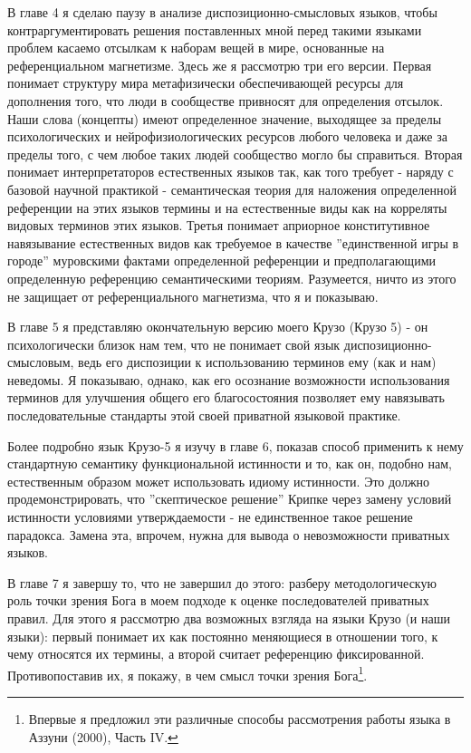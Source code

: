 \documentclass{book}
\begin{document}
В главе 4 я сделаю паузу в анализе диспозиционно-смысловых языков, чтобы контраргументировать решения поставленных мной перед такими языками проблем касаемо отсылкам к наборам вещей в мире, основанные на референциальном магнетизме. Здесь же я рассмотрю три его версии. Первая понимает структуру мира метафизически обеспечивающей ресурсы для дополнения того, что люди в сообществе привносят для определения отсылок. Наши слова (концепты) имеют определенное значение, выходящее за пределы психологических и нейрофизиологических ресурсов любого человека и даже за пределы того, с чем любое таких людей сообщество могло бы справиться. Вторая понимает интерпретаторов естественных языков так, как того требует - наряду с базовой научной практикой - семантическая теория для наложения определенной референции на этих языков термины и на естественные виды как на корреляты видовых терминов этих языков. Третья понимает априорное конститутивное навязывание естественных видов как требуемое в качестве ''единственной игры в городе'' муровскими фактами определенной референции и предполагающими определенную референцию семантическими теориям. Разумеется, ничто из этого не защищает от референциального магнетизма, что я и показываю.

В главе 5 я представляю окончательную версию моего Крузо (Крузо 5) - он психологически близок нам тем, что не понимает свой язык диспозиционно-смысловым, ведь его диспозиции к использованию терминов ему (как и нам) неведомы. Я показываю, однако, как его осознание возможности использования терминов для улучшения общего его благосостояния позволяет ему навязывать последовательные стандарты этой своей приватной языковой практике.

Более подробно язык Крузо-5 я изучу в главе 6, показав способ применить к нему стандартную семантику функциональной истинности и то, как он, подобно нам, естественным образом может использовать идиому истинности. Это должно продемонстрировать, что ''скептическое решение'' Крипке через замену условий истинности условиями утверждаемости - не единственное такое решение парадокса. Замена эта, впрочем, нужна для вывода о невозможности приватных языков.

В главе 7 я завершу то, что не завершил до этого: разберу методологическую роль точки зрения Бога в моем подходе к оценке последователей приватных правил. Для этого я рассмотрю два возможных взгляда на языки Крузо (и наши языки): первый понимает их как постоянно меняющиеся в отношении того, к чему относятся их термины, а второй считает референцию фиксированной. Противопоставив их, я покажу, в чем смысл точки зрения Бога\footnote{Впервые я предложил эти различные способы рассмотрения работы языка в Аззуни (2000), Часть IV.}.
\end{document}
